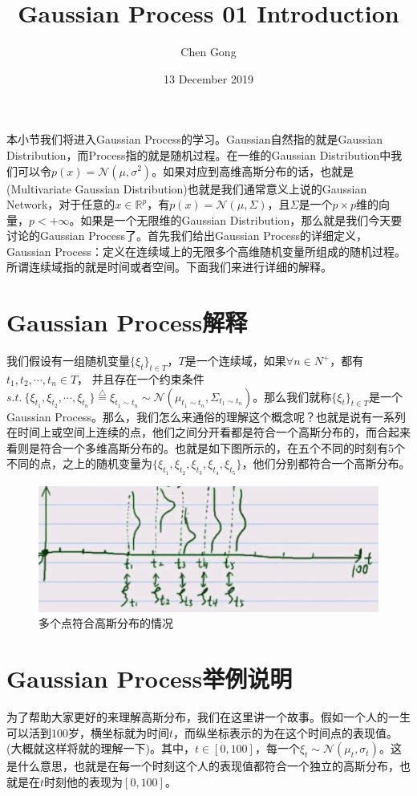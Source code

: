 \documentclass[a4paper]{article}
\title{Gaussian Process 01 Introduction}
\author{Chen Gong}
\date{13 December 2019}
\begin{document}
\maketitle
本小节我们将进入Gaussian Process的学习。Gaussian自然指的就是Gaussian Distribution，而Process指的就是随机过程。在一维的Gaussian Distribution中我们可以令$p(x) = \mathcal{N}(\mu,\sigma^2)$。如果对应到高维高斯分布的话，也就是(Multivariate Gaussian Distribution)也就是我们通常意义上说的Gaussian Network，对于任意的$x\in \mathbb{R}^p$，有$p(x) = \mathcal{N}(\mu,\Sigma)$，且$\Sigma$是一个$p\times p$维的向量，$p< +\infty$。如果是一个无限维的Gaussian Distribution，那么就是我们今天要讨论的Gaussian Process了。首先我们给出Gaussian Process的详细定义，{\color{red}Gaussian Process：定义在连续域上的无限多个高维随机变量所组成的随机过程。 }所谓连续域指的就是时间或者空间。下面我们来进行详细的解释。

\section{Gaussian Process解释}
我们假设有一组随机变量$\{ \xi_t \}_{t\in T}$，$T$是一个连续域，如果$\forall n \in N^+$，都有$t_1,t_2,\cdots,t_n \in T$，
并且存在一个约束条件$s.t.\ \{\xi_{t_1},\xi_{t_2},\cdots,\xi_{t_n}\} \stackrel{\triangle}{=} \xi_{t_1\sim t_n} \sim \mathcal{N}(\mu_{t_1\sim t_n},\Sigma_{t_1\sim t_n})$。那么我们就称$\{ \xi_t \}_{t\in T}$是一个Gaussian Process。那么，我们怎么来通俗的理解这个概念呢？也就是说有一系列在时间上或空间上连续的点，他们之间分开看都是符合一个高斯分布的，而合起来看则是符合一个多维高斯分布的。也就是如下图所示的，在五个不同的时刻有5个不同的点，之上的随机变量为$\{\xi_{t_1},\xi_{t_2},\xi_{t_3},\xi_{t_4},\xi_{t_5}\}$，他们分别都符合一个高斯分布。
\begin{figure}[H]
    \centering
    \includegraphics[width=.55\textwidth]{微信图片_20191213121553.png}
    \caption{多个点符合高斯分布的情况}
    \label{fig:my_label_1}
\end{figure}

\section{Gaussian Process举例说明}
为了帮助大家更好的来理解高斯分布，我们在这里讲一个故事。假如一个人的一生可以活到100岁，横坐标就为时间$t$，而纵坐标表示的为在这个时间点的表现值。(大概就这样将就的理解一下)。其中，$t \in [0,100]$，每一个$\xi_t \sim \mathcal{N}(\mu_t,\sigma_t)$。这是什么意思，也就是在每一个时刻这个人的表现值都符合一个独立的高斯分布，也就是在$t$时刻他的表现为$[0,100]$。
\end{document}
